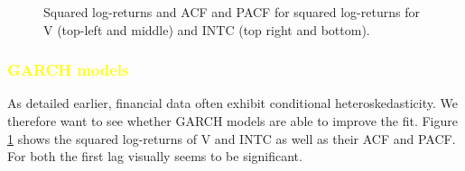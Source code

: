 
\begin{figure}[h]
    \centering
    \begin{adjustbox}{width=.95\textwidth,center}
    
    
    \end{adjustbox}
    \hspace{3ex}
    \begin{adjustbox}{width=.95\textwidth,center}
    
    \end{adjustbox}
    \begin{adjustbox}{width=.95\textwidth,center}
    
    \end{adjustbox}
    \caption{Squared log-returns and ACF and PACF for squared log-returns for V (top-left and middle) and INTC (top right and bottom).}
    \label{fig:V_INTC_squared}
\end{figure}


\subsubsection{\textcolor{yellow}{GARCH models}}
As detailed earlier, financial data often exhibit conditional heteroskedasticity. We therefore want to see whether GARCH models are able to improve the fit. Figure \ref{fig:V_INTC_squared} shows the squared log-returns of V and INTC as well as their ACF and PACF. For both the first lag visually seems to be significant. 

